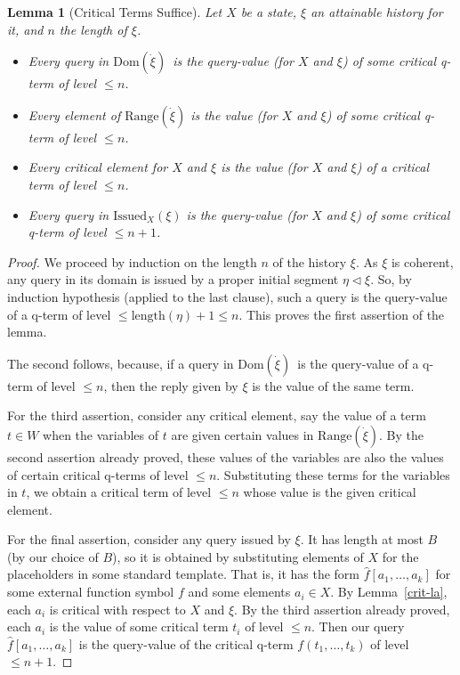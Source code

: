 \documentclass{LMCS}
\newtheorem{la}[thm]{Lemma}
\theoremstyle{definition}
\newenvironment{ls}{\begin{itemize}}{\end{itemize}}
\newcommand{\Issued}{\text{Issued}}
\newcommand{\ans}{\dot}
\newcommand{\dom}[1]{\ensuremath{{\text{Dom}}(#1)}}
\newcommand{\init}{\lhd}
\newcommand{\ran}[1]{\ensuremath{{\text{Range}}(#1)}}
\begin{document}
\begin{la}[Critical Terms Suffice]  \label{tags-suff}
Let $X$ be a state, $\xi$ an attainable history for it, and $n$ the
length of $\xi$.
\begin{ls}
  \item Every query in \dom{\ans\xi}\ is the query-value (for $X$ and $\xi$) of
some critical q-term of level $\leq n$.
   \item Every element of \ran{\ans\xi} is the value (for $X$ and
   $\xi$) of some critical q-term of level $\leq n$.
   \item Every critical element for $X$ and $\xi$ is the value (for
   $X$ and $\xi$) of a critical term of level $\leq n$.
   \item Every query in $\Issued_X(\xi)$ is the query-value (for $X$ and
$\xi$) of some critical q-term of level $\leq n+1$.
\end{ls}
\end{la}

\begin{proof}
We proceed by induction on the length $n$ of the history $\xi$. As
$\xi$ is coherent, any query in its domain is issued by a proper
initial segment $\eta\init\xi$.  So, by induction hypothesis
(applied to the last clause), such a query is the query-value of a
q-term of level $\leq\text{length}(\eta)+1 \le n$. This proves the
first assertion of the lemma.

The second follows, because, if a query in \dom{\ans\xi}\ is the
query-value of a q-term of level $\le n$, then the reply given by
$\xi$ is the value of the same term.

For the third assertion, consider any critical element, say the value
of a term $t\in W$ when the variables of $t$ are given certain values
in \ran{\ans\xi}.  By the second assertion already proved, these
values of the variables are also the values of certain critical
q-terms of level $\leq n$. Substituting these terms for the variables
in $t$, we obtain a critical term of level $\leq n$ whose value is the
given critical element.

For the final assertion, consider any query issued by $\xi$.  It has
length at most $B$ (by our choice of $B$), so it is obtained by
substituting elements of $X$ for the placeholders in some standard
template.  That is, it has the form $\hat f[a_1,\dots,a_k]$ for some
external function symbol $f$ and some elements $a_i\in X$.  By
Lemma~\ref{crit-la}, each $a_i$ is critical with respect to $X$ and
$\xi$.  By the third assertion already proved, each $a_i$ is the value
of some critical term $t_i$ of level $\leq n$.  Then our query $\hat
f[a_1,\dots,a_k]$ is the query-value of the critical q-term
$f(t_1,\dots,t_k)$ of level $\leq n+1$.
\end{proof}
\end{document}
